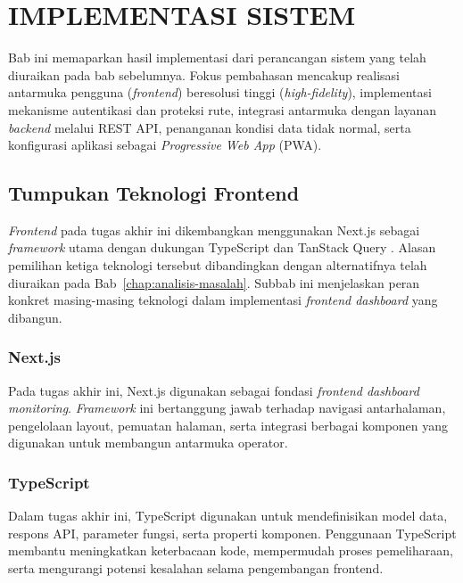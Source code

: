 \cleardoublepage
\chapter{IMPLEMENTASI SISTEM}
\label{chap:implementasi-sistem}

Bab ini memaparkan hasil implementasi dari perancangan sistem yang telah diuraikan pada bab sebelumnya. 
Fokus pembahasan mencakup realisasi antarmuka pengguna (\textit{frontend}) beresolusi tinggi (\textit{high-fidelity}), 
implementasi mekanisme autentikasi dan proteksi rute, integrasi antarmuka dengan layanan \textit{backend} melalui 
REST API, penanganan kondisi data tidak normal, serta konfigurasi aplikasi sebagai \textit{Progressive Web App} (PWA).

\section{Tumpukan Teknologi Frontend}

\textit{Frontend} pada tugas akhir ini dikembangkan menggunakan Next.js \autocite{vercel_nextjs} sebagai \textit{framework}
utama dengan dukungan TypeScript dan TanStack Query \autocite{linsley_tanstack}. Alasan pemilihan ketiga teknologi
tersebut dibandingkan dengan alternatifnya telah diuraikan pada Bab~\ref{chap:analisis-masalah}. Subbab ini
menjelaskan peran konkret masing-masing teknologi dalam implementasi \textit{frontend dashboard} yang dibangun.

\subsection{Next.js}

Pada tugas akhir ini, Next.js digunakan sebagai fondasi \textit{frontend dashboard
monitoring}. \textit{Framework} ini bertanggung jawab terhadap navigasi antarhalaman,
pengelolaan layout, pemuatan halaman, serta integrasi berbagai komponen yang
digunakan untuk membangun antarmuka operator.

\subsection{TypeScript}

Dalam tugas akhir ini, TypeScript digunakan untuk mendefinisikan model data,
respons API, parameter fungsi, serta properti komponen. Penggunaan TypeScript
membantu meningkatkan keterbacaan kode, mempermudah proses pemeliharaan, serta
mengurangi potensi kesalahan selama pengembangan frontend.

